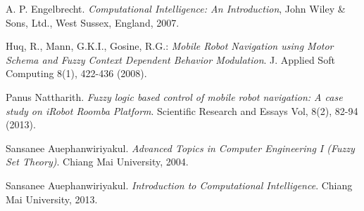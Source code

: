 \documentclass[paper=a4, fontsize=11pt]{scrartcl}
\numberwithin{equation}{section}		%
\numberwithin{figure}{section}			%
\numberwithin{table}{section}				%
\begin{document}
	
	\begin{thebibliography}{9}
		
		A. P. Engelbrecht. \textit{Computational Intelligence: An Introduction}, John Wiley \& Sons, Ltd., West Sussex, England, 2007.
		
		Huq, R., Mann, G.K.I., Gosine, R.G.: \textit{Mobile Robot Navigation using Motor Schema and Fuzzy Context Dependent Behavior Modulation}. J. Applied Soft Computing 8(1), 422-436 (2008).
		
		Panus Nattharith. 
		\textit{Fuzzy logic based control of mobile robot navigation: A case study on iRobot Roomba Platform}. Scientific Research and Essays Vol, 8(2), 82-94 (2013).
		
		Sansanee Auephanwiriyakul. 
		\textit{Advanced Topics in Computer Engineering I (Fuzzy Set Theory)}. Chiang Mai University, 2004.
		
		Sansanee Auephanwiriyakul. 
		\textit{Introduction to Computational Intelligence}. Chiang Mai University, 2013.
		
	\end{thebibliography}
	
	
\end{document}
